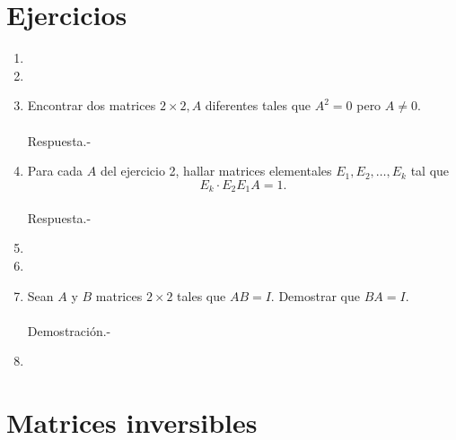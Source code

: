 \section*{Ejercicios}

\begin{enumerate}[1.]

    \item 

    \item 

    \item Encontrar dos matrices $2\times 2,A$ diferentes tales que $A^2=0$ pero $A\neq 0.$\\\\
	Respuesta.-\;

    \item  Para cada $A$ del ejercicio 2, hallar matrices elementales $E_1,E_2,\ldots,E_k$ tal que 
	$$E_k\cdot E_2E_1A=1.$$\\
    Respuesta.-\;

    \item 

    \item 

    \item Sean $A$ y $B$ matrices $2\times 2$ tales que $AB=I$. Demostrar que $BA=I.$\\\\
	Demostración.-\;

    \item 

\end{enumerate}


\section{Matrices inversibles}
